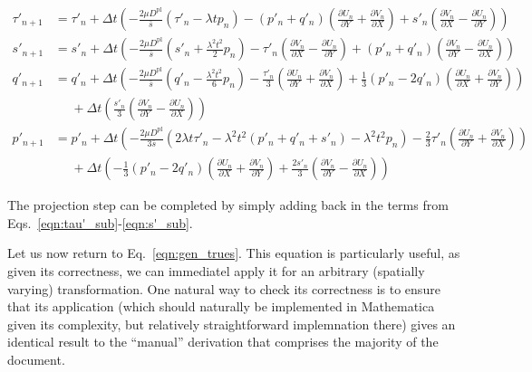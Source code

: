 \documentclass[11pt]{article}
\newcommand{\p}{\partial}
\newcommand{\Dpl}{D^\text{pl}}
\newcommand{\dVndX}{\frac{\p V_n}{\p X}}
\newcommand{\dVndY}{\frac{\p V_n}{\p Y}}
\newcommand{\dUndX}{\frac{\p U_n}{\p X}}
\newcommand{\dUndY}{\frac{\p U_n}{\p Y}}
\newcommand{\sbar}{\bar{s}}
\begin{document}
\begin{align}
    \tau'_{n+1} &= \tau'_n + \Delta t \left(-\frac{2\mu\Dpl}{\bar{s}}\left(\tau'_n - \lambda t p_n\right) - (p'_n + q'_n)\left(\dUndY + \dVndX\right) + s'_n\left(\dVndX - \dUndY\right)\right)\\
    s'_{n+1} &= s'_n + \Delta t \left(-\frac{2\mu\Dpl}{\sbar}\left(s'_n + \frac{\lambda^2t^2}{2}p_n\right) - \tau'_n\left(\dVndX - \dUndY\right) + (p'_n + q'_n)\left(\dVndY - \dUndX\right)\right)\\
    q'_{n+1} &= q'_n + \Delta t \left(-\frac{2\mu\Dpl}{\sbar}\left(q'_n - \frac{\lambda^2t^2}{6}p_n\right) - \frac{\tau'_n}{3}\left(\dUndY + \dVndX\right) + \frac{1}{3}(p'_n - 2q'_n)\left(\dUndX + \dVndY\right)\right)\nonumber \\
    &\phantom{=} + \Delta t\left(\frac{s'_n}{3}\left(\dVndY - \dUndX\right)\right)\\
    p'_{n+1} &= p'_n + \Delta t \left(-\frac{2\mu\Dpl}{3\sbar}(2\lambda t\tau'_n - \lambda^2 t^2 (p'_n + q'_n + s'_n) - \lambda^2 t^2 p_n) - \frac{2}{3}\tau'_n\left(\dUndY + \dVndX\right)\right)\nonumber\\
    &\phantom{=} + \Delta t\left(-\frac{1}{3}(p'_n - 2q'_n)\left(\dUndX + \dVndY\right) + \frac{2s'_n}{3}\left(\dVndY - \dUndX\right)\right)
\end{align}

The projection step can be completed by simply adding back in the terms from Eqs.~\ref{eqn:tau'_sub}-\ref{eqn:s'_sub}.

Let us now return to Eq.~\ref{eqn:gen_trues}. This equation is particularly useful, as given its correctness, we can immediatel apply it for an arbitrary (spatially varying) transformation. One natural way to check its correctness is to ensure that its application (which should naturally be implemented in Mathematica given its complexity, but relatively straightforward implemnation there) gives an identical result to the ``manual'' derivation that comprises the majority of the document.
\end{document}
